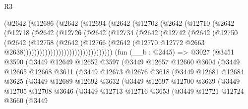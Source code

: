 \begin{lexlean}{R3}
\begin{coremodule}
                      (@2642
                        (@12686
                          (@2642
                            (@12694
                              (@2642
                                (@12702
                                  (@2642
                                    (@12710
                                      (@2642
                                        (@12718
                                          (@2642
                                            (@12726
                                              (@2642
                                                (@12734
                                                  (@2642
                                                    (@12742
                                                      (@2642
                                                        (@12750
                                                          (@2642
                                                            (@12758
                                                              (@2642
                                                                (@12766
                                                                  (@2642
                                                                    (@12770
                                                                      @12772
                                                                      @2663
                                                                      @2638)))))))))))))))))))))))))))))))))
    (fun (__b : @2445) =>
    @3027
      (@3451
        @3590
        (@3449
          @12649
          @12652
          @3597
          (@3449
            @12657
            @12660
            @3604
            (@3449
              @12665
              @12668
              @3611
              (@3449
                @12673
                @12676
                @3618
                (@3449
                  @12681
                  @12684
                  @3625
                  (@3449
                    @12689
                    @12692
                    @3632
                    (@3449
                      @12697
                      @12700
                      @3639
                      (@3449
                        @12705
                        @12708
                        @3646
                        (@3449
                          @12713
                          @12716
                          @3653
                          (@3449
                            @12721
                            @12724
                            @3660
                            (@3449

\end{coremodule}
\end{lexlean}
